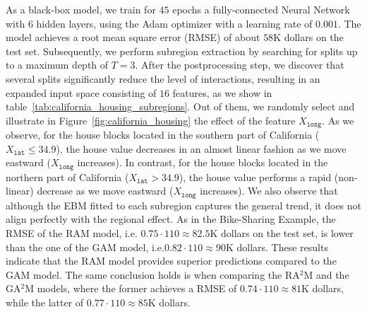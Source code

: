 \documentclass[runningheads]{llncs}
\begin{document}
As a black-box model, we train for $45$ epochs a fully-connected Neural Network with 6 hidden layers,
using the Adam optimizer with a learning rate of $0.001$.
The model achieves a root mean square error (RMSE) of about \(58\)K dollars on the test set.
Subsequently, we perform subregion extraction by searching for splits up to a maximum depth of \(T=3\).
After the postprocessing step, we discover that several splits significantly reduce the level of interactions,
resulting in an expanded input space consisting of \(16\) features, as we show in table~\ref{tab:california_housing_subregions}.
Out of them, we randomly select and illustrate in Figure~\ref{fig:california_housing} the effect of the feature $X_{\mathtt{long}}$.
As we observe, for the house blocks located in the southern part of California ($X_{\mathtt{lat}} \leq 34.9$),
the house value decreases in an almost linear fashion as we move eastward ($X_{\mathtt{long}}$ increases).
In contrast, for the house blocks located in the northern part of California ($X_{\mathtt{lat}} > 34.9$),
the house value performs a rapid (non-linear) decrease as we move eastward ($X_{\mathtt{long}}$ increases).
We also observe that although the EBM fitted to each subregion captures the general trend,
it does not align perfectly with the regional effect.
As in the Bike-Sharing Example, the RMSE of the RAM model, i.e. \( 0.75 \cdot 110 \approx 82.5\)K dollars on the test set,
is lower than the one of the GAM model, i.e.\( 0.82 \cdot 110 \approx 90\)K dollars.
These results indicate that the RAM model provides superior predictions compared to the GAM model.
The same conclusion holds is when comparing the RA$^2$M and the GA$^2$M models,
where the former achieves a RMSE of \( 0.74 \cdot 110 \approx 81\)K dollars,
while the latter of \( 0.77 \cdot 110 \approx 85\)K dollars.
\end{document}
